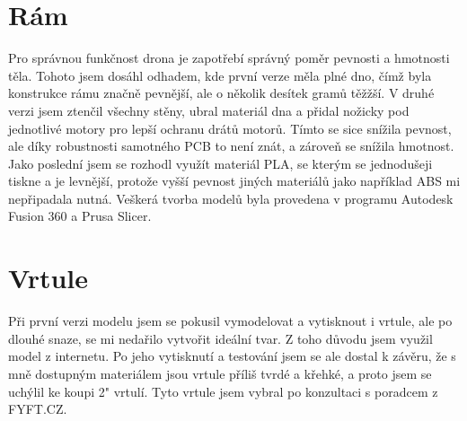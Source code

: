 \section{Rám}
    Pro správnou funkčnost drona je zapotřebí správný poměr pevnosti a hmotnosti těla. Tohoto jsem dosáhl odhadem, kde první verze měla plné dno, čímž byla konstrukce rámu značně pevnější, ale o několik desítek gramů těžžší. V druhé verzi jsem ztenčil všechny stěny, ubral materiál dna a přidal nožicky pod jednotlivé motory pro lepší ochranu drátů motorů. Tímto se sice snížila pevnost, ale díky robustnosti samotného PCB to není znát, a zároveň se snížila hmotnost. Jako poslední jsem se rozhodl využít materiál PLA, se kterým se jednodušeji tiskne a je levnější, protože vyšší pevnost jiných materiálů jako například ABS mi nepřipadala nutná. Veškerá tvorba modelů byla provedena v programu Autodesk Fusion 360 a Prusa Slicer.

\section{Vrtule}
    Při první verzi modelu jsem se pokusil vymodelovat a vytisknout i vrtule, ale po dlouhé snaze, se mi nedařilo vytvořit ideální tvar. Z toho důvodu jsem využil model z internetu. Po jeho vytisknutí a testování jsem se ale dostal k závěru, že s mně dostupným materiálem jsou vrtule příliš tvrdé a křehké, a proto jsem se uchýlil ke koupi 2" vrtulí. Tyto vrtule jsem vybral po konzultaci s poradcem z FYFT.CZ.